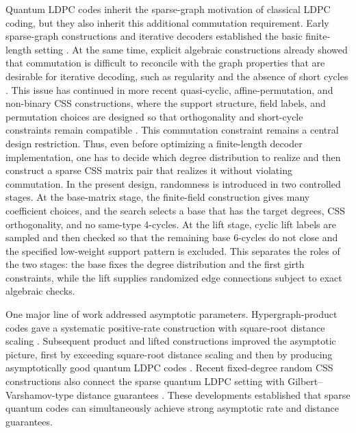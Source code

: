 \documentclass[11pt,a4paper]{article}
\theoremstyle{uprighttheorem}
\begin{document}
Quantum LDPC codes inherit the sparse-graph motivation of classical LDPC coding, but they also inherit this additional commutation requirement.
Early sparse-graph constructions and iterative decoders established the basic finite-length setting \cite{mackay2004sparse,poulin2008iterative}.
At the same time, explicit algebraic constructions already showed that commutation is difficult to reconcile with the graph properties that are desirable for iterative decoding, such as regularity and the absence of short cycles \cite{hagiwara2007qc,aly2007finitegeometry}.
This issue has continued in more recent quasi-cyclic, affine-permutation, and non-binary CSS constructions, where the support structure, field labels, and permutation choices are designed so that orthogonality and short-cycle constraints remain compatible \cite{komoto2025columnweight2,kasai2025girth16apm,kasai2025nonbinaryextension}.
This commutation constraint remains a central design restriction.
Thus, even before optimizing a finite-length decoder implementation, one has to decide which degree distribution to realize and then construct a sparse CSS matrix pair that realizes it without violating commutation.
In the present design, randomness is introduced in two controlled stages.
At the base-matrix stage, the finite-field construction gives many coefficient choices, and the search selects a base that has the target degrees, CSS orthogonality, and no same-type 4-cycles.
At the lift stage, cyclic lift labels are sampled and then checked so that the remaining base 6-cycles do not close and the specified low-weight support pattern is excluded.
This separates the roles of the two stages: the base fixes the degree distribution and the first girth constraints, while the lift supplies randomized edge connections subject to exact algebraic checks.

One major line of work addressed asymptotic parameters.
Hypergraph-product codes gave a systematic positive-rate construction with square-root distance scaling \cite{tillich2014quantum}.
Subsequent product and lifted constructions improved the asymptotic picture, first by exceeding square-root distance scaling and then by producing asymptotically good quantum LDPC codes \cite{hastings2021quantum_ldpc,panteleev2022asymptotically,leverrier2022quantum}.
Recent fixed-degree random CSS constructions also connect the sparse quantum LDPC setting with Gilbert--Varshamov-type distance guarantees \cite{kasai2026gv}.
These developments established that sparse quantum codes can simultaneously achieve strong asymptotic rate and distance guarantees.
\end{document}
